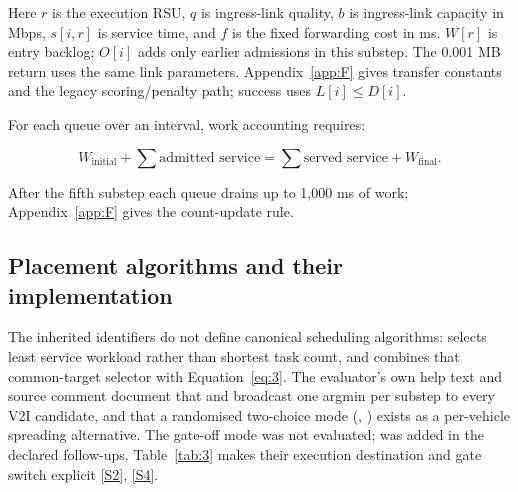 \documentclass[12pt,a4paper]{article}
\begin{document}
Here $r$ is the execution RSU, $q$ is ingress-link quality, $b$ is ingress-link capacity in Mbps, $s[i,r]$ is service time, and $f$ is the fixed forwarding cost in ms. $W[r]$ is entry backlog; $O[i]$ adds only earlier admissions in this substep. The 0.001 MB return uses the same link parameters. Appendix~\ref{app:F} gives transfer constants and the legacy scoring/penalty path; success uses $L[i]\leq D[i]$.



For each queue over an interval, work accounting requires:

\begin{equation}\label{eq:5}
 W_{\mathrm{initial}}+\sum\text{admitted service}
 =\sum\text{served service}+W_{\mathrm{final}}.
\end{equation}

After the fifth substep each queue drains up to 1,000 ms of work; Appendix~\ref{app:F} gives the count-update rule.

\FloatBarrier
\subsection{Placement algorithms and their implementation}\label{sec:2.5}

The inherited identifiers do not define canonical scheduling algorithms:  selects least service workload rather than shortest task count, and  combines that common-target selector with Equation~\eqref{eq:3}. The evaluator's own help text and source comment document that  and  broadcast one argmin per substep to every V2I candidate, and that a randomised two-choice mode (, ) exists as a per-vehicle spreading alternative. The gate-off  mode was not evaluated;  was added in the declared follow-ups. Table~\ref{tab:3} makes their execution destination and gate switch explicit \hyperref[source-s2]{[S2]}, \hyperref[source-s4]{[S4]}.
\end{document}
